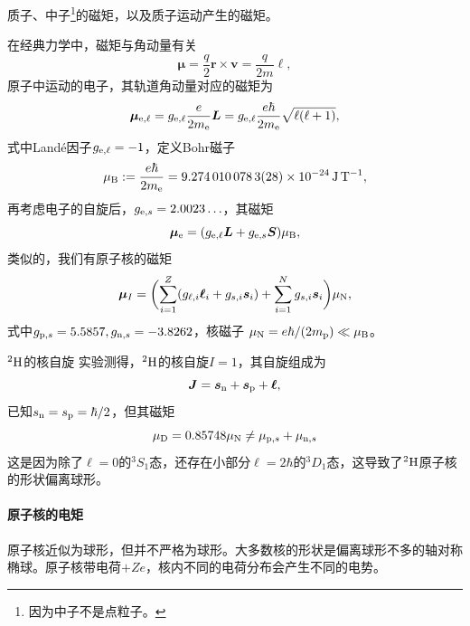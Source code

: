 质子、中子\footnote{因为中子不是点粒子。}的磁矩，以及质子运动产生的磁矩。

在经典力学中，磁矩与角动量有关
\begin{equation}\label{eq:nrd-orbital-magnetic-moment}
	\bm\mu = \frac{q}2\bm r \times \bm v = \frac{q}{2m}\bm\ell,
\end{equation}
原子中运动的电子，其轨道角动量对应的磁矩为
\[
	\bm\mu_{\mathrm{e},\ell} = g_{\mathrm{e},\ell}\frac{e}{2m_{\mathrm{e}}}\bm L = g_{\mathrm{e},\ell}\frac{e\hbar}{2m_{\mathrm{e}}}\sqrt{\ell(\ell + 1)},
\]
式中Landé因子$g_{\mathrm{e},\ell} = -1$，定义Bohr磁子
\begin{equation}\label{eq:nrd-bohr-magneton}
	\muB := \frac{e\hbar}{2m_\electron} = \qty[uncertainty-mode = compact]{9.2740100783(28)e-24}{\joule\per\tesla},
\end{equation}
再考虑电子的自旋后，$g_{\mathrm{e},s} = 2.0023\ldots$，其磁矩
\[
	\bm\mu_{\mathrm{e}} = (g_{\mathrm{e},\ell}\bm L + g_{\mathrm{e},s}\bm S)\mu_{\mathrm{B}},
\]
类似的，我们有原子核的磁矩
\begin{equation}\label{eq:nrd-nuclear-magnetic-moment}
	\bm\mu_I = \biggl(\sum_{i=1}^Z(g_{\ell,i}\bm\ell_i + g_{s,i}\bm s_i) + \sum_{i=1}^Ng_{s,i}\bm s_i\biggr)\mu_{\mathrm{N}},
\end{equation}
式中$g_{\mathrm{p},s} = 5.5857,g_{\mathrm n,s} = -3.8262$，核磁子 $\mu_{\mathrm{N}} = e\hbar/(2m_{\mathrm{p}}) \ll \mu_{\mathrm{B}}$。
\begin{example}{$\nuclide2H$的核自旋}{}
	实验测得，$\nuclide2H$的核自旋$I = 1$，其自旋组成为
	\[
		\bm J = \bm s_\mathrm n + \bm s_{\mathrm{p}} + \bm\ell,
	\]
	已知$s_\mathrm n = s_{\mathrm{p}} = \hbar/2$，但其磁矩
	\[
		\mu_{\mathrm{D}} = 0.85748\mu_{\mathrm{N}} \neq \mu_{\mathrm{p},s} + \mu_{\mathrm n,s}
	\]
	这是因为除了$\ell = 0$的$^3S_1$态，还存在小部分$\ell = 2\hbar$的$^3D_1$态，这导致了$\nuclide2H$原子核的形状偏离球形。
\end{example}
\paragraph{原子核的电矩}原子核近似为球形，但并不严格为球形。大多数核的形状是偏离球形不多的轴对称椭球。原子核带电荷$+Ze$，核内不同的电荷分布会产生不同的电势。


